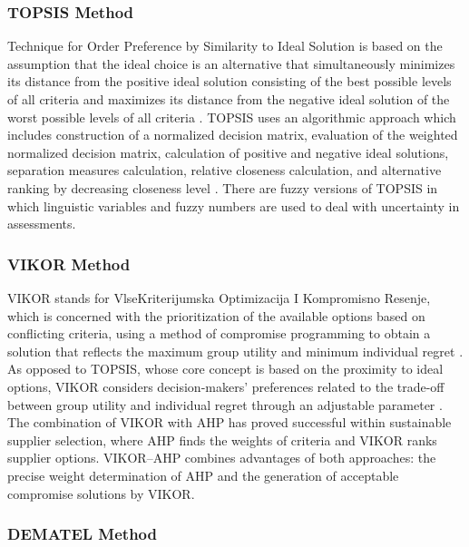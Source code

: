 \documentclass[11pt]{article}
\begin{document}
\subsubsection{TOPSIS Method}

Technique for Order Preference by Similarity to Ideal Solution is based on the assumption that the ideal choice is an alternative that simultaneously minimizes its distance from the positive ideal solution consisting of the best possible levels of all criteria and maximizes its distance from the negative ideal solution of the worst possible levels of all criteria \cite{ref31,ref32}. TOPSIS uses an algorithmic approach which includes construction of a normalized decision matrix, evaluation of the weighted normalized decision matrix, calculation of positive and negative ideal solutions, separation measures calculation, relative closeness calculation, and alternative ranking by decreasing closeness level \cite{ref32}. There are fuzzy versions of TOPSIS in which linguistic variables and fuzzy numbers are used to deal with uncertainty in assessments.

\subsubsection{VIKOR Method}

VIKOR stands for VlseKriterijumska Optimizacija I Kompromisno Resenje, which is concerned with the prioritization of the available options based on conflicting criteria, using a method of compromise programming to obtain a solution that reflects the maximum group utility and minimum individual regret \cite{ref27,ref33}. As opposed to TOPSIS, whose core concept is based on the proximity to ideal options, VIKOR considers decision-makers' preferences related to the trade-off between group utility and individual regret through an adjustable parameter \cite{ref33}. The combination of VIKOR with AHP has proved successful within sustainable supplier selection, where AHP finds the weights of criteria and VIKOR ranks supplier options. VIKOR--AHP combines advantages of both approaches: the precise weight determination of AHP and the generation of acceptable compromise solutions by VIKOR.

\subsubsection{DEMATEL Method}
\end{document}
